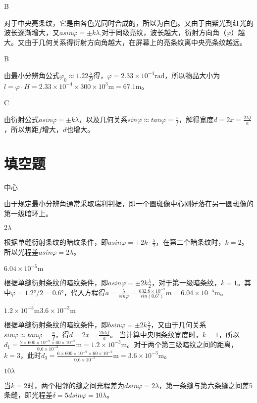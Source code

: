 \exercise B

\solve
对于中央亮条纹，它是由各色光同时合成的，所以为白色。又由于由紫光到红光的波长逐渐增大，又$asin\varphi=\pm k\lambda$,对于同级亮纹，波长越大，衍射方向角（$\varphi$）越大。又由于几何关系得衍射方向角越大，在屏幕上的亮条纹离中央亮条纹越远。

\exercise B

\solve
由最小分辨角公式$\varphi_0\approx1.22\frac{\lambda}{D}$得，$\varphi=2.33\times10^{-4}\mathrm{rad}$，所以物品大小为$l=\varphi\cdot H=2.33\times10^{-4}\times300\times10^{3}\mathrm{m}=67.1\mathrm{m}$。

\exercise C

\solve
由衍射公式$asin\varphi=\pm k\lambda$，以及几何关系$sin\varphi\approx tan\varphi=\frac{x}{f}$，解得宽度$d=2x=\frac{2\lambda f}{a}$，所以焦距$f$增大，$d$也增大。

\section{填空题}
\exercise 中心

\solve
由于规定最小分辨角通常采取瑞利判据，即一个圆斑像中心刚好落在另一圆斑像的第一级暗环上。

\exercise $2\lambda$

\solve
根据单缝衍射条纹的暗纹条件，即$asin\varphi=\pm2k\cdot\frac{\lambda}{2}$，在第二个暗条纹时，$k=2$。所以光程差$asin\varphi=2\lambda$。

\exercise $6.04\times10^{-5}\mathrm{m}$

\solve
根据单缝衍射条纹的暗纹条件，即$asin\varphi=\pm2k\frac{\lambda}{2}$，对于第一级暗条纹，$k=1$。其中$\varphi=1.2°/2=0.6°$，代入方程得$a=\frac{\lambda}{sin\varphi}=\frac{632.8\times10^{-9}}{sin(0.6°)}m=6.04\times10^{-5}\mathrm{m}$。

\exercise $1.2\times10^{-3}\mathrm{m}$\quad $3.6\times10^{-3}\mathrm{m}$

\solve
根据单缝衍射条纹的暗纹条件，即$bsin\varphi=\pm2k\frac{\lambda}{2}$，又由于几何关系$sin\varphi\approx tan\varphi=\frac{x}{f}$，得$d=2x=\frac{2k\lambda f}{a}$。 当计算中央明条纹宽度时，$k=1$，所以$d_1=\frac{2\times600\times10^{-9}\times60\times10^{-2}}{0.6\times10^{-3}}\mathrm{m}=1.2\times10^{-3}\mathrm{m}$。对于两个第三级暗纹之间的距离，$k=3$，此时$d_3=\frac{6\times600\times10^{-9}\times60\times10^{-2}}{0.6\times10^{-3}}\mathrm{m}=3.6\times10^{-3}\mathrm{m}$。

\exercise $10\lambda$

\solve
当$k=2$时，两个相邻的缝之间光程差为$dsin\varphi=2\lambda$，第一条缝与第六条缝之间差5条缝，即光程差$\delta=5dsin\varphi=10\lambda$。

